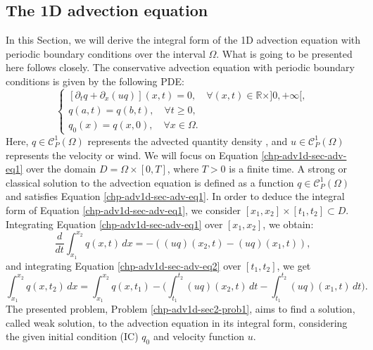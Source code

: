 \subsection{The 1D advection equation}
In this Section, we will derive the integral form of the 1D advection equation with periodic boundary conditions over the interval $\Omega$.
What is going to be presented here follows \citet{leveque:1990,leveque:2002} closely.
The conservative advection equation with periodic boundary conditions is given by the following PDE:
\begin{equation}
	\label{chp-adv1d-sec-adv-eq1}
	\begin{cases}
		[{\partial_t q} + {\partial_x (uq)}](x, t)
		= 0, \quad \forall (x,t) \in \mathbb{R}\times ]0, +\infty[,\\
		{q}(a, t) = {q}(b, t), \quad \forall t\geq 0,\\
		q_0(x) = q(x,0), \quad \forall x \in \Omega.
	\end{cases}
\end{equation}
Here, $q \in \mathcal{C}_P^1{(\Omega)}$ represents the advected quantity density \citep{zerroukat:2006}, and $u \in \mathcal{C}_P^1{(\Omega)}$ represents the velocity or wind.
We will focus on Equation \eqref{chp-adv1d-sec-adv-eq1} over the domain $D = \Omega\times[0,T]$, where $T>0$ is a finite time.
A strong or classical solution to the advection equation is defined as a function ${q}\in\mathcal{C}^1_P(\Omega)$ 
and satisfies Equation \eqref{chp-adv1d-sec-adv-eq1}.
In order to deduce the integral form of Equation \eqref{chp-adv1d-sec-adv-eq1}, we consider
$[x_1, x_2]\times[t_1,t_2]\subset D$. 
Integrating Equation \eqref{chp-adv1d-sec-adv-eq1} over $[x_1, x_2]$, we obtain:
\begin{equation}
    \label{chp-adv1d-sec-adv-eq2}
	\frac{d}{dt} \int_{x_1}^{x_2} q(x,t) \,dx =  
	-({(uq)}(x_2,t) - {(uq)}(x_1,t)) ,
\end{equation}
and integrating Equation \eqref{chp-adv1d-sec-adv-eq2} over $[t_1,t_2]$, we get
\begin{equation}
    \label{chp-adv1d-sec-adv-eq3}
    \int_{x_1}^{x_2} q(x,t_2) \,dx=  \int_{x_1}^{x_2} q(x,t_1)
	-\bigg( \int_{t_1}^{t_2} 
	{(uq)}(x_2, t) \,dt - 
	\int_{t_1}^{t_2}{(uq)}(x_1, t) \,dt \bigg).
\end{equation}
The presented problem, Problem \ref{chp-adv1d-sec2-prob1}, aims to find a solution, called weak solution, to the advection equation
in its integral form, considering the given initial condition (IC) ${q}_0$ and velocity function $u$.

